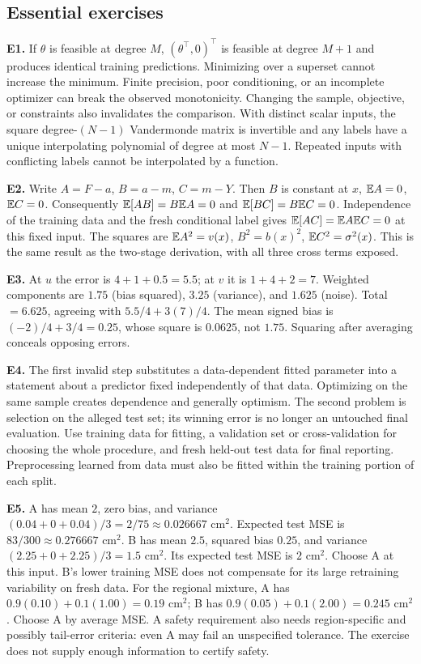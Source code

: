 \subsection*{Essential exercises}
\textbf{E1.} If $\theta$ is feasible at degree $M$, $(\theta^\top,0)^\top$ is feasible at degree $M+1$ and produces identical training predictions. Minimizing over a superset cannot increase the minimum. Finite precision, poor conditioning, or an incomplete optimizer can break the observed monotonicity. Changing the sample, objective, or constraints also invalidates the comparison. With distinct scalar inputs, the square degree-$(N-1)$ Vandermonde matrix is invertible and any labels have a unique interpolating polynomial of degree at most $N-1$. Repeated inputs with conflicting labels cannot be interpolated by a function.

\textbf{E2.} Write $A=F-a$, $B=a-m$, $C=m-Y$. Then $B$ is constant at $x$, $\mathbb{E} A=0$, $\mathbb{E} C=0$. Consequently $\mathbb{E}[AB]=B\mathbb{E} A=0$ and $\mathbb{E}[BC]=B\mathbb{E} C=0$. Independence of the training data and the fresh conditional label gives $\mathbb{E}[AC]=\mathbb{E} A\mathbb{E} C=0$ at this fixed input. The squares are $\mathbb{E} A^2=v(x)$, $B^2=b(x)^2$, $\mathbb{E} C^2=\sigma^2(x)$. This is the same result as the two-stage derivation, with all three cross terms exposed.

\textbf{E3.} At $u$ the error is $4+1+0.5=5.5$; at $v$ it is $1+4+2=7$. Weighted components are $1.75$ (bias squared), $3.25$ (variance), and $1.625$ (noise). Total $=6.625$, agreeing with $5.5/4+3(7)/4$. The mean signed bias is $(-2)/4+3/4=0.25$, whose square is $0.0625$, not $1.75$. Squaring after averaging conceals opposing errors.

\textbf{E4.} The first invalid step substitutes a data-dependent fitted parameter into a statement about a predictor fixed independently of that data. Optimizing on the same sample creates dependence and generally optimism. The second problem is selection on the alleged test set; its winning error is no longer an untouched final evaluation. Use training data for fitting, a validation set or cross-validation for choosing the whole procedure, and fresh held-out test data for final reporting. Preprocessing learned from data must also be fitted within the training portion of each split.

\textbf{E5.} A has mean $2$, zero bias, and variance $(0.04+0+0.04)/3=2/75\approx0.026667$ cm$^2$. Expected test MSE is $83/300\approx0.276667$ cm$^2$. B has mean $2.5$, squared bias $0.25$, and variance $(2.25+0+2.25)/3=1.5$ cm$^2$. Its expected test MSE is $2$ cm$^2$. Choose A at this input. B's lower training MSE does not compensate for its large retraining variability on fresh data. For the regional mixture, A has $0.9(0.10)+0.1(1.00)=0.19$ cm$^2$; B has $0.9(0.05)+0.1(2.00)=0.245$ cm$^2$. Choose A by average MSE. A safety requirement also needs region-specific and possibly tail-error criteria: even A may fail an unspecified tolerance. The exercise does not supply enough information to certify safety.

